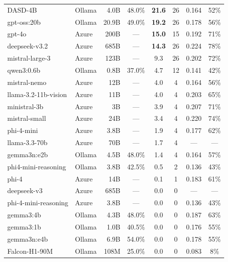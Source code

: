 \documentclass[11pt,a4paper]{article}
\begin{document}
\begin{longtable}{@{}llrccccc@{}}
DASD-4B              & Ollama & 4.0B  & \textcolor{tierB}{48.0\%} & \textbf{21.6} & 26 & 0.164 & 52\% \\
gpt-oss:20b          & Ollama & 20.9B & \textcolor{tierB}{49.0\%} & \textbf{19.2} & 26 & 0.178 & 56\% \\
gpt-4o               & Azure  & 200B  & ---                       & \textbf{15.0} & 15 & 0.192 & 71\% \\
deepseek-v3.2        & Azure  & 685B  & ---                       & \textbf{14.3} & 26 & 0.224 & 78\% \\
mistral-large-3      & Azure  & 123B  & ---                       & 9.3           & 26 & 0.202 & 72\% \\
qwen3:0.6b           & Ollama & 0.8B  & \textcolor{tierD}{37.0\%} & 4.7           & 12 & 0.141 & 42\% \\
mistral-nemo         & Azure  & 12B   & ---                       & 4.0           & 4  & 0.164 & 56\% \\
llama-3.2-11b-vision & Azure  & 11B   & ---                       & 4.0           & 4  & 0.203 & 65\% \\
ministral-3b         & Azure  & 3B    & ---                       & 3.9           & 4  & 0.207 & 71\% \\
mistral-small        & Azure  & 24B   & ---                       & 3.4           & 4  & 0.220 & 74\% \\
phi-4-mini           & Azure  & 3.8B  & ---                       & 1.9           & 4  & 0.177 & 62\% \\
llama-3.3-70b        & Azure  & 70B   & ---                       & 1.7           & 4  & ---   & --- \\
gemma3n:e2b          & Ollama & 4.5B  & \textcolor{tierB}{48.0\%} & 1.4           & 4  & 0.164 & 57\% \\
phi4-mini-reasoning  & Ollama & 3.8B  & \textcolor{tierC}{42.5\%} & 0.5           & 2  & 0.136 & 43\% \\
phi-4                & Azure  & 14B   & ---                       & 0.1           & 1  & 0.183 & 61\% \\
deepseek-v3          & Azure  & 685B  & ---                       & 0.0           & 0  & ---   & --- \\
phi-4-mini-reasoning & Azure  & 3.8B  & ---                       & 0.0           & 0  & 0.136 & 43\% \\
gemma3:4b            & Ollama & 4.3B  & \textcolor{tierB}{48.0\%} & 0.0           & 0  & 0.187 & 63\% \\
gemma3:1b            & Ollama & 1.0B  & \textcolor{tierC}{40.5\%} & 0.0           & 0  & 0.176 & 55\% \\
gemma3n:e4b          & Ollama & 6.9B  & \textcolor{tierA}{54.0\%} & 0.0           & 0  & 0.178 & 55\% \\
Falcon-H1-90M        & Ollama & 108M  & \textcolor{tierF}{25.0\%} & 0.0           & 0  & 0.083 & 8\% \\

\end{longtable}
\end{document}
